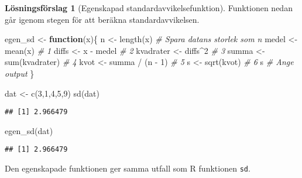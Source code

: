 \documentclass[
]{book}
\newenvironment{Shaded}{\begin{snugshade}}{\end{snugshade}}
\newcommand{\CommentTok}[1]{\textcolor[rgb]{0.56,0.35,0.01}{\textit{#1}}}
\newcommand{\ControlFlowTok}[1]{\textcolor[rgb]{0.13,0.29,0.53}{\textbf{#1}}}
\newcommand{\DecValTok}[1]{\textcolor[rgb]{0.00,0.00,0.81}{#1}}
\newcommand{\FunctionTok}[1]{\textcolor[rgb]{0.00,0.00,0.00}{#1}}
\newcommand{\NormalTok}[1]{#1}
\newcommand{\OtherTok}[1]{\textcolor[rgb]{0.56,0.35,0.01}{#1}}
\newcommand{\SpecialCharTok}[1]{\textcolor[rgb]{0.00,0.00,0.00}{#1}}
\theoremstyle{definition}
\theoremstyle{definition}
\theoremstyle{definition}
\theoremstyle{definition}
\newtheorem{hypothesis}{Lösningsförslag}[chapter]
\theoremstyle{remark}
\begin{document}
\begin{hypothesis}[Egenskapad standardavvikelsefunktion]
Funktionen nedan går igenom stegen för att beräkna standardavvikelsen.

\begin{Shaded}
\begin{Highlighting}[]
\NormalTok{egen\_sd }\OtherTok{\textless{}{-}} \ControlFlowTok{function}\NormalTok{(x)\{}
\NormalTok{  n }\OtherTok{\textless{}{-}} \FunctionTok{length}\NormalTok{(x)          }\CommentTok{\# Spara datans storlek som n}
\NormalTok{  medel }\OtherTok{\textless{}{-}} \FunctionTok{mean}\NormalTok{(x)        }\CommentTok{\# 1}
\NormalTok{  diffs }\OtherTok{\textless{}{-}}\NormalTok{ x }\SpecialCharTok{{-}}\NormalTok{ medel      }\CommentTok{\# 2}
\NormalTok{  kvadrater }\OtherTok{\textless{}{-}}\NormalTok{ diffs}\SpecialCharTok{\^{}}\DecValTok{2}    \CommentTok{\# 3}
\NormalTok{  summa }\OtherTok{\textless{}{-}} \FunctionTok{sum}\NormalTok{(kvadrater) }\CommentTok{\# 4}
\NormalTok{  kvot }\OtherTok{\textless{}{-}}\NormalTok{ summa }\SpecialCharTok{/}\NormalTok{ (n }\SpecialCharTok{{-}} \DecValTok{1}\NormalTok{) }\CommentTok{\# 5}
\NormalTok{  s }\OtherTok{\textless{}{-}} \FunctionTok{sqrt}\NormalTok{(kvot)         }\CommentTok{\# 6}
\NormalTok{  s                       }\CommentTok{\# Ange output}
\NormalTok{\}}

\NormalTok{dat }\OtherTok{\textless{}{-}} \FunctionTok{c}\NormalTok{(}\DecValTok{3}\NormalTok{,}\DecValTok{1}\NormalTok{,}\DecValTok{4}\NormalTok{,}\DecValTok{5}\NormalTok{,}\DecValTok{9}\NormalTok{)}
\FunctionTok{sd}\NormalTok{(dat)}
\end{Highlighting}
\end{Shaded}

\begin{verbatim}
## [1] 2.966479
\end{verbatim}

\begin{Shaded}
\begin{Highlighting}[]
\FunctionTok{egen\_sd}\NormalTok{(dat)}
\end{Highlighting}
\end{Shaded}

\begin{verbatim}
## [1] 2.966479
\end{verbatim}

Den egenskapade funktionen ger samma utfall som R funktionen \texttt{sd}.
\end{hypothesis}
\end{document}
